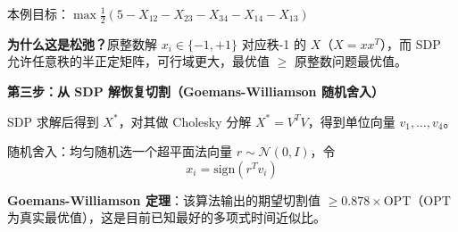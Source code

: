 \documentclass[12pt, a4paper]{ctexart}
\begin{document}
\begin{blackboard}
本例目标：$\max \frac{1}{2}(5 - X_{12} - X_{23} - X_{34} - X_{14} - X_{13})$

\textbf{为什么这是松弛？}原整数解 $x_i\in\{-1,+1\}$ 对应秩-1 的 $X$（$X = xx^T$），而 SDP 允许任意秩的半正定矩阵，可行域更大，最优值 $\geq$ 原整数问题最优值。

\textbf{第三步：从 SDP 解恢复切割（Goemans-Williamson 随机舍入）}

SDP 求解后得到 $X^*$，对其做 Cholesky 分解 $X^* = V^TV$，得到单位向量 $v_1,\ldots,v_4$。

随机舍入：均匀随机选一个超平面法向量 $r \sim \mathcal{N}(0, I)$，令
\[
x_i = \text{sign}(r^T v_i)
\]

\textbf{Goemans-Williamson 定理}：该算法输出的期望切割值 $\geq 0.878 \times \text{OPT}$（$\text{OPT}$ 为真实最优值），这是目前已知最好的多项式时间近似比。

\begin{center}
\end{center}

\end{blackboard}
\end{document}
